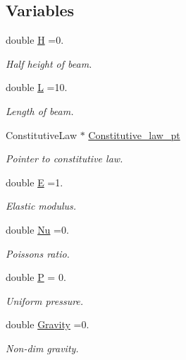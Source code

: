 \subsection*{Variables}
\begin{DoxyCompactItemize}
\item 
double \hyperlink{namespaceGlobal__Physical__Variables_af6e07423e22c0991084d9a2f43727805}{H} =0.
\begin{DoxyCompactList}\small\item\em Half height of beam. \end{DoxyCompactList}\item 
double \hyperlink{namespaceGlobal__Physical__Variables_a1b8bfc451f6b7ac89eca18f04338f47f}{L} =10.
\begin{DoxyCompactList}\small\item\em Length of beam. \end{DoxyCompactList}\item 
Constitutive\+Law $\ast$ \hyperlink{namespaceGlobal__Physical__Variables_a5d5f19442938130d36ee7476ae25049c}{Constitutive\+\_\+law\+\_\+pt}
\begin{DoxyCompactList}\small\item\em Pointer to constitutive law. \end{DoxyCompactList}\item 
double \hyperlink{namespaceGlobal__Physical__Variables_a09a019474b7405b35da2437f7779bc7e}{E} =1.
\begin{DoxyCompactList}\small\item\em Elastic modulus. \end{DoxyCompactList}\item 
double \hyperlink{namespaceGlobal__Physical__Variables_a3962c36313826b19f216f6bbbdd6a477}{Nu} =0.
\begin{DoxyCompactList}\small\item\em Poisson\textquotesingle{}s ratio. \end{DoxyCompactList}\item 
double \hyperlink{namespaceGlobal__Physical__Variables_a23c2ade6398f54040b869f7f3a2bcc4b}{P} = 0.
\begin{DoxyCompactList}\small\item\em Uniform pressure. \end{DoxyCompactList}\item 
double \hyperlink{namespaceGlobal__Physical__Variables_a8b80d3e8d63b8d0a0ed435a2dd7fe2ad}{Gravity} =0.
\begin{DoxyCompactList}\small\item\em Non-\/dim gravity. \end{DoxyCompactList}\item 

\end{DoxyCompactItemize}
